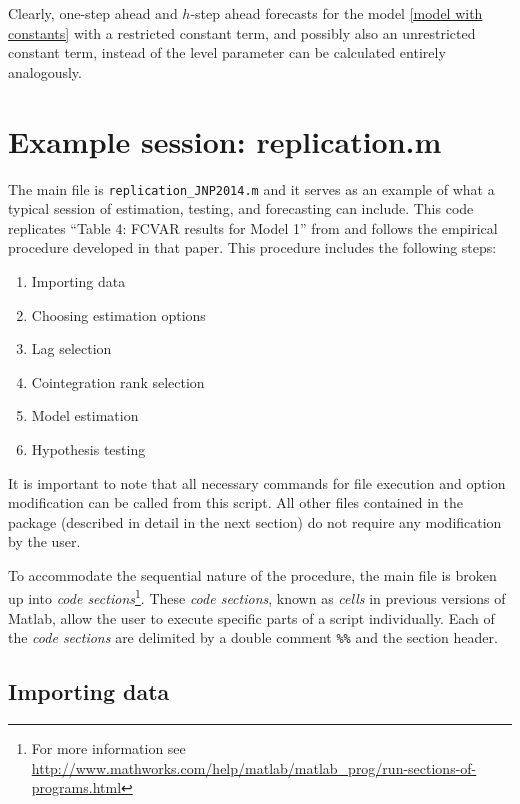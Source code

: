 \documentclass[10pt]{article}
\begin{document}
Clearly, one-step ahead and $h$-step ahead forecasts for the model \eqref{model with constants} with a restricted constant term, and possibly also an unrestricted constant term, instead of the level parameter can be calculated entirely analogously.


\newpage

\section{Example session: replication.m}
\label{sec main}


The main file is \verb|replication_JNP2014.m| and it serves as an example of what a typical session of estimation, testing, and forecasting can include. This code replicates ``Table 4: FCVAR results for Model 1'' from \cite{JNP2014} and follows the empirical procedure developed in that paper. This procedure includes the following steps:

\begin{enumerate}
\item Importing data
\item Choosing estimation options
\item Lag selection
\item Cointegration rank selection
\item Model estimation
\item Hypothesis testing
\end{enumerate}

It is important to note that all necessary commands for file execution and option modification can be called from this script. All other files contained in the package (described in detail in the next section) do not require any modification by the user.

To accommodate the sequential nature of the procedure, the main file is broken up into \textit{code sections}\footnote{For more information see \url{ http://www.mathworks.com/help/matlab/matlab_prog/run-sections-of-programs.html}}. These \textit{code sections}, known as \textit{cells} in previous versions of Matlab, allow the user to execute specific parts of a script individually. Each of the \textit{code sections} are delimited by a double comment \verb|%%| and the section header. 


\subsection{Importing data}
\end{document}
